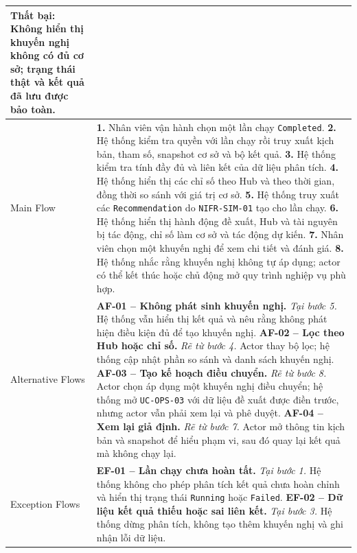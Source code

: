 \begin{longtable}{|L{42mm}|L{102mm}|}
    \textbf{Thất bại:} Không hiển thị khuyến nghị không có đủ cơ sở; trạng thái thật và kết quả đã lưu được bảo toàn.\\\hline
  Main Flow &
    \textbf{1.} Nhân viên vận hành chọn một lần chạy \texttt{Completed}.\newline
    \textbf{2.} Hệ thống kiểm tra quyền với lần chạy rồi truy xuất kịch bản, tham số, snapshot cơ sở và bộ kết quả.\newline
    \textbf{3.} Hệ thống kiểm tra tính đầy đủ và liên kết của dữ liệu phân tích.\newline
    \textbf{4.} Hệ thống hiển thị các chỉ số theo Hub và theo thời gian, đồng thời so sánh với giá trị cơ sở.\newline
    \textbf{5.} Hệ thống truy xuất các \texttt{Recommendation} do \texttt{NIFR-SIM-01} tạo cho lần chạy.\newline
    \textbf{6.} Hệ thống hiển thị hành động đề xuất, Hub và tài nguyên bị tác động, chỉ số làm cơ sở và tác động dự kiến.\newline
    \textbf{7.} Nhân viên chọn một khuyến nghị để xem chi tiết và đánh giá.\newline
    \textbf{8.} Hệ thống nhắc rằng khuyến nghị không tự áp dụng; actor có thể kết thúc hoặc chủ động mở quy trình nghiệp vụ phù hợp.\\\hline
  Alternative Flows &
    \textbf{AF-01 -- Không phát sinh khuyến nghị.} \textit{Tại bước 5.} Hệ thống vẫn hiển thị kết quả và nêu rằng không phát hiện điều kiện đủ để tạo khuyến nghị.\newline
    \textbf{AF-02 -- Lọc theo Hub hoặc chỉ số.} \textit{Rẽ từ bước 4.} Actor thay bộ lọc; hệ thống cập nhật phần so sánh và danh sách khuyến nghị.\newline
    \textbf{AF-03 -- Tạo kế hoạch điều chuyển.} \textit{Rẽ từ bước 8.} Actor chọn áp dụng một khuyến nghị điều chuyển; hệ thống mở \texttt{UC-OPS-03} với dữ liệu đề xuất được điền trước, nhưng actor vẫn phải xem lại và phê duyệt.\newline
    \textbf{AF-04 -- Xem lại giả định.} \textit{Rẽ từ bước 7.} Actor mở thông tin kịch bản và snapshot để hiểu phạm vi, sau đó quay lại kết quả mà không chạy lại.\\\hline
  Exception Flows &
    \textbf{EF-01 -- Lần chạy chưa hoàn tất.} \textit{Tại bước 1.} Hệ thống không cho phép phân tích kết quả chưa hoàn chỉnh và hiển thị trạng thái \texttt{Running} hoặc \texttt{Failed}.\newline
    \textbf{EF-02 -- Dữ liệu kết quả thiếu hoặc sai liên kết.} \textit{Tại bước 3.} Hệ thống dừng phân tích, không tạo thêm khuyến nghị và ghi nhận lỗi dữ liệu.\newline

\end{longtable}

